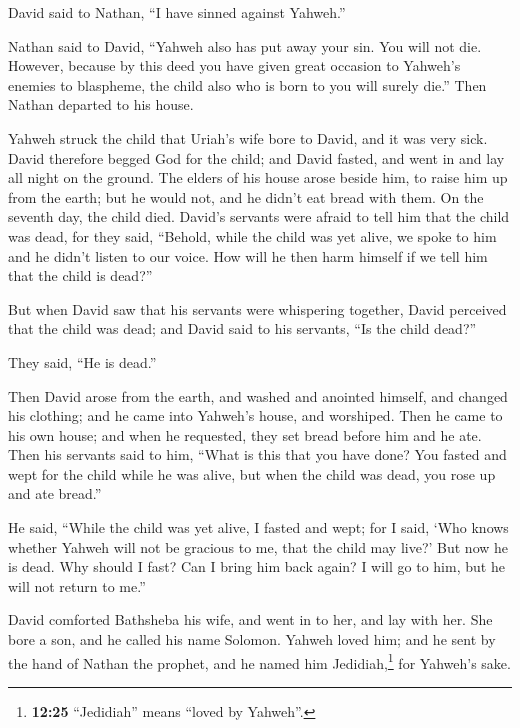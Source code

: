  David said to Nathan, ``I have sinned against Yahweh.''

Nathan said to David, ``Yahweh also has put away your sin. You will not
die.  However, because by this deed you have given great
occasion to Yahweh's enemies to blaspheme, the child also who is born to
you will surely die.''  Then Nathan departed to his
house.

Yahweh struck the child that Uriah's wife bore to David, and it was very
sick.  David therefore begged God for the child; and
David fasted, and went in and lay all night on the ground.
 The elders of his house arose beside him, to raise him
up from the earth; but he would not, and he didn't eat bread with them.
 On the seventh day, the child died. David's servants
were afraid to tell him that the child was dead, for they said,
``Behold, while the child was yet alive, we spoke to him and he didn't
listen to our voice. How will he then harm himself if we tell him that
the child is dead?''

 But when David saw that his servants were whispering
together, David perceived that the child was dead; and David said to his
servants, ``Is the child dead?''

They said, ``He is dead.''

 Then David arose from the earth, and washed and anointed
himself, and changed his clothing; and he came into Yahweh's house, and
worshiped. Then he came to his own house; and when he requested, they
set bread before him and he ate.  Then his servants said
to him, ``What is this that you have done? You fasted and wept for the
child while he was alive, but when the child was dead, you rose up and
ate bread.''

 He said, ``While the child was yet alive, I fasted and
wept; for I said, `Who knows whether Yahweh will not be gracious to me,
that the child may live?'  But now he is dead. Why should
I fast? Can I bring him back again? I will go to him, but he will not
return to me.''

 David comforted Bathsheba his wife, and went in to her,
and lay with her. She bore a son, and he called his name Solomon. Yahweh
loved him;  and he sent by the hand of Nathan the
prophet, and he named him Jedidiah,\footnote{\textbf{12:25} ``Jedidiah''
  means ``loved by Yahweh''.} for Yahweh's sake.

